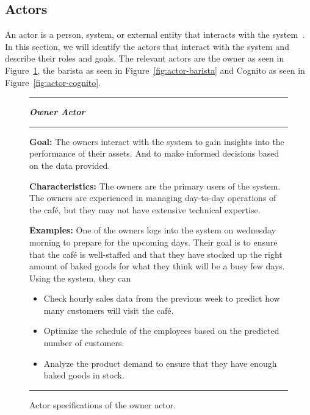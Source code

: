 \subsection{Actors}\label{subsec:actors}

An actor is a person, system, or external entity that interacts with the system~\cite{mathiassen2018}.
In this section, we will identify the actors that interact with the system and describe their roles and goals.
The relevant actors are the owner as seen in Figure~\ref{fig:actor-owner}, the barista as seen in
Figure~\ref{fig:actor-barista} and Cognito as seen in Figure~\ref{fig:actor-cognito}.

\begin{figure}[H]
    \noindent
    \rule{\textwidth}{0.4pt}
    \begin{center}
    \noindent
    \textit{\textbf{Owner Actor}}
    \end{center}

    \noindent
    \rule{\textwidth}{0.4pt}

    \noindent
    \textbf{Goal:} The owners interact with the system to gain insights into the performance of their assets.
    And to make informed decisions based on the data provided.
    \newline

    \noindent
    \textbf{Characteristics:} The owners are the primary users of the system.
    The owners are experienced in managing day-to-day operations of the café, but they may not have extensive technical
    expertise.
    \newline

    \noindent
    \textbf{Examples:} One of the owners logs into the system on wednesday morning to prepare for the upcoming days.
    Their goal is to ensure that the café is well-staffed and that they have stocked up the right amount of baked goods
    for what they think will be a busy few days.
    Using the system, they can

    \begin{itemize}
        \item Check hourly sales data from the previous week to predict how many customers will
        visit the café.
        \item Optimize the schedule of the employees based on the predicted number of customers.
        \item Analyze the product demand to ensure that they have enough baked goods in stock.
    \end{itemize}
    \noindent
    \rule{\textwidth}{0.4pt}

    \caption{Actor specifications of the owner actor.
    }\label{fig:actor-owner}
\end{figure}

